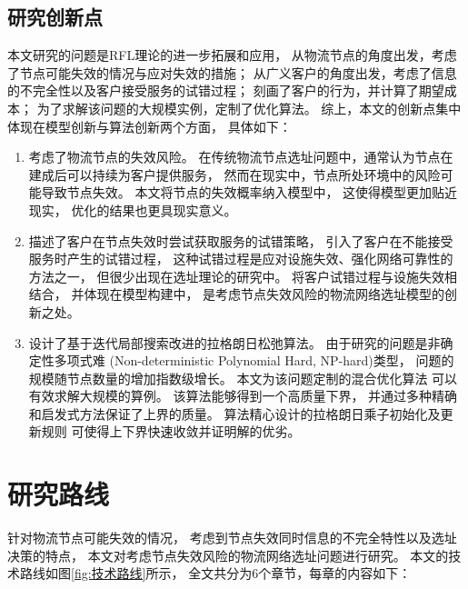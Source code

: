 \subsection{研究创新点} %
\label{subsec:创新点}
本文研究的问题是RFL理论的进一步拓展和应用，
从物流节点的角度出发，考虑了节点可能失效的情况与应对失效的措施；
从广义客户的角度出发，考虑了信息的不完全性以及客户接受服务的试错过程；
刻画了客户的行为，并计算了期望成本；
为了求解该问题的大规模实例，定制了优化算法。
综上，本文的创新点集中体现在模型创新与算法创新两个方面，
具体如下：
\begin{enumerate}[label=(\arabic*),leftmargin=0pt,itemindent=3.5\ccwd,nosep]
  \item 考虑了物流节点的失效风险。
  在传统物流节点选址问题中，通常认为节点在建成后可以持续为客户提供服务，
  然而在现实中，节点所处环境中的风险可能导致节点失效。
  本文将节点的失效概率纳入模型中，
  这使得模型更加贴近现实，
  优化的结果也更具现实意义。

  \item 描述了客户在节点失效时尝试获取服务的试错策略，
  引入了客户在不能接受服务时产生的试错过程，
  这种试错过程是应对设施失效、强化网络可靠性的方法之一，
  但很少出现在选址理论的研究中。
  将客户试错过程与设施失效相结合，
  并体现在模型构建中，
  是考虑节点失效风险的物流网络选址模型的创新之处。

  \item 设计了基于迭代局部搜索改进的拉格朗日松弛算法。
  由于研究的问题是非确定性多项式难
  (Non-deterministic Polynomial Hard, NP-hard)类型，
  问题的规模随节点数量的增加指数级增长。
  本文为该问题定制的混合优化算法
  可以有效求解大规模的算例。
  该算法能够得到一个高质量下界，
  并通过多种精确和启发式方法保证了上界的质量。
  算法精心设计的拉格朗日乘子初始化及更新规则
  可使得上下界快速收敛并证明解的优劣。
\end{enumerate}

\section{研究路线} %
\label{sec:研究路线}
针对物流节点可能失效的情况，
考虑到节点失效同时信息的不完全特性以及选址决策的特点，
本文对考虑节点失效风险的物流网络选址问题进行研究。
本文的技术路线如图\ref{fig:技术路线}所示，
全文共分为6个章节，每章的内容如下：


